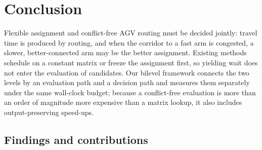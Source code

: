 \documentclass[manuscript,screen,review]{acmart}
\begin{document}
\section{Conclusion}

Flexible assignment and conflict-free AGV routing must be decided jointly: travel time is produced by routing, and when the corridor to a fast arm is congested, a slower, better-connected arm may be the better assignment.
Existing methods schedule on a constant matrix or freeze the assignment first, so yielding wait does not enter the evaluation of candidates.
Our bilevel framework connects the two levels by an evaluation path and a decision path and measures them separately under the same wall-clock budget; because a conflict-free evaluation is more than an order of magnitude more expensive than a matrix lookup, it also includes output-preserving speed-ups.

\subsection{Findings and contributions}
\label{sec:contributions}
\end{document}
